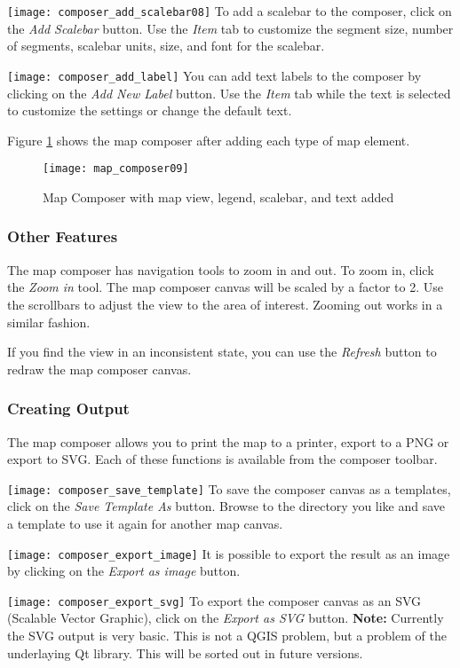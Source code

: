\texttt{[image: composer\_add\_scalebar08]} To
add a scalebar to the composer, click on the \textit{Add Scalebar} button. Use
the \textit{Item} tab to customize the segment size, number of segments,
scalebar units, size, and font for the scalebar.

\texttt{[image: composer\_add\_label]} You can
add text labels to the composer by clicking on the \textit{Add New Label}
button. Use the \textit{Item} tab while the text is selected to customize the
settings or change the default text.

Figure \ref{fig:map_composer_complete} shows the map composer after adding
each type of map element.
\begin{figure}[h]
   \begin{center}
   \caption{Map Composer with map view, legend, scalebar, and text added}\label{fig:map_composer_complete}\smallskip
   \texttt{[image: map\_composer09]}
\end{center}  
\end{figure}

\subsubsection{Other Features}

The map composer has navigation tools to zoom in and out. To zoom in, click
the \textit{Zoom in} tool. The map composer canvas will be scaled by a factor to 2. Use
the scrollbars to adjust the view to the area of interest. Zooming out works
in a similar fashion.

If you find the view in an inconsistent state, you can use the \textit{Refresh} button
to redraw the map composer canvas.

\subsubsection{Creating Output}

The map composer allows you to print the map to a printer, export to a PNG or
export to SVG. Each of these functions is available from the composer toolbar.

\texttt{[image: composer\_save\_template]} To save the composer canvas 
as a templates, click on the \textit{Save Template As} button. Browse to the directory 
you like and save a template to use it again for another map canvas.

\texttt{[image: composer\_export\_image]} It is possible to export the result 
as an image by clicking on the \textit{Export as image} button. 

\texttt{[image: composer\_export\_svg]} To export the composer canvas as an 
SVG (Scalable Vector Graphic), click on the \textit{Export as SVG} button. 
\textbf{Note:} Currently the SVG output is very basic. This is not a QGIS problem, but a
problem of the underlaying Qt library. This will be sorted out in future versions.
 
